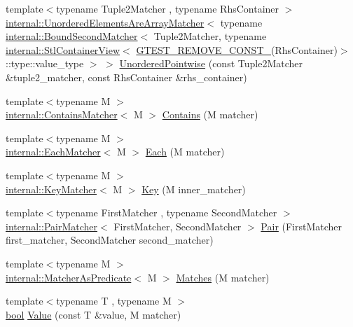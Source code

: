 \begin{DoxyCompactItemize}
{\footnotesize template$<$typename Tuple2\+Matcher , typename Rhs\+Container $>$ }\\\hyperlink{classtesting_1_1internal_1_1UnorderedElementsAreArrayMatcher}{internal\+::\+Unordered\+Elements\+Are\+Array\+Matcher}$<$ typename \hyperlink{classtesting_1_1internal_1_1BoundSecondMatcher}{internal\+::\+Bound\+Second\+Matcher}$<$ Tuple2\+Matcher, typename \hyperlink{classtesting_1_1internal_1_1StlContainerView}{internal\+::\+Stl\+Container\+View}$<$ \hyperlink{gtest-internal_8h_a2ffec8c60510eb130af387f5ce9a756a}{G\+T\+E\+S\+T\+\_\+\+R\+E\+M\+O\+V\+E\+\_\+\+C\+O\+N\+S\+T\+\_\+}(Rhs\+Container)$>$\+::type\+::value\+\_\+type $>$ $>$ \hyperlink{namespacetesting_a3e800c56ae70a6d9955077a75d4971f1}{Unordered\+Pointwise} (const Tuple2\+Matcher \&tuple2\+\_\+matcher, const Rhs\+Container \&rhs\+\_\+container)
\item 
{\footnotesize template$<$typename M $>$ }\\\hyperlink{classtesting_1_1internal_1_1ContainsMatcher}{internal\+::\+Contains\+Matcher}$<$ M $>$ \hyperlink{namespacetesting_a2a12af7db4752797d06c1182b2470933}{Contains} (M matcher)
\item 
{\footnotesize template$<$typename M $>$ }\\\hyperlink{classtesting_1_1internal_1_1EachMatcher}{internal\+::\+Each\+Matcher}$<$ M $>$ \hyperlink{namespacetesting_a42743c985b1e02dc373ab7517ca1e740}{Each} (M matcher)
\item 
{\footnotesize template$<$typename M $>$ }\\\hyperlink{classtesting_1_1internal_1_1KeyMatcher}{internal\+::\+Key\+Matcher}$<$ M $>$ \hyperlink{namespacetesting_a6212e76b542f4ffd3079de59092a826a}{Key} (M inner\+\_\+matcher)
\item 
{\footnotesize template$<$typename First\+Matcher , typename Second\+Matcher $>$ }\\\hyperlink{classtesting_1_1internal_1_1PairMatcher}{internal\+::\+Pair\+Matcher}$<$ First\+Matcher, Second\+Matcher $>$ \hyperlink{namespacetesting_ac7520de8af26d3085513eeeb68561889}{Pair} (First\+Matcher first\+\_\+matcher, Second\+Matcher second\+\_\+matcher)
\item 
{\footnotesize template$<$typename M $>$ }\\\hyperlink{classtesting_1_1internal_1_1MatcherAsPredicate}{internal\+::\+Matcher\+As\+Predicate}$<$ M $>$ \hyperlink{namespacetesting_ad53b509ae9cd51040d67f668f99702ae}{Matches} (M matcher)
\item 
{\footnotesize template$<$typename T , typename M $>$ }\\\hyperlink{classbool}{bool} \hyperlink{namespacetesting_ae44c50a3a7f0a46f05c8a0b0592b4a62}{Value} (const T \&value, M matcher)

\end{DoxyCompactItemize}
